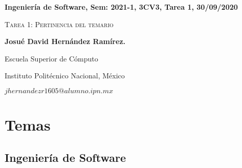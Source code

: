 \documentclass[12pt,twoside]{article}
\date{}
\begin{document}
\centerline{\bf Ingeniería de Software, Sem: 2021-1, 3CV3, Tarea 1, 30/09/2020}
\centerline{}
\centerline{}
\begin{center}
\Large{\textsc{Tarea 1: Pertinencia del temario}}
\end{center}
\centerline{}
\centerline{\bf {Josu\'e David Hern\'andez Ram\'irez.}}
\centerline{}
\centerline{Escuela Superior de C\'omputo}
\centerline{Instituto Polit\'ecnico Nacional, M\'exico}
\centerline{$jhernandezr1605@alumno.ipn.mx$}
\newtheorem{Theorem}{\quad Theorem}[section]
\newtheorem{Definition}[Theorem]{\quad Definition}
\newtheorem{Corollary}[Theorem]{\quad Corollary}
\newtheorem{Lemma}[Theorem]{\quad Lemma}
\newtheorem{Example}[Theorem]{\quad Example}
\bigskip
\section{Temas}
\subsection{Ingenier\'ia de Software}
\end{document}

